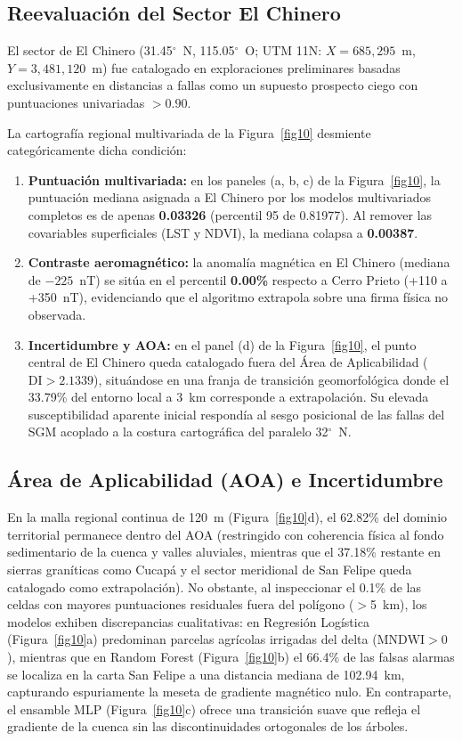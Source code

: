 \documentclass[10pt,twocolumn,a4paper]{article}
\begin{document}
\subsection{Reevaluación del Sector El Chinero}
El sector de El Chinero (31.45$^\circ$~N, 115.05$^\circ$~O; UTM 11N: $X = 685,295$~m, $Y = 3,481,120$~m) fue catalogado en exploraciones preliminares basadas exclusivamente en distancias a fallas como un supuesto prospecto ciego con puntuaciones univariadas $>0.90$.

La cartografía regional multivariada de la Figura~\ref{fig10} desmiente categóricamente dicha condición:
\begin{enumerate}
\itemsep0pt  
\item \textbf{Puntuación multivariada:} en los paneles (a, b, c) de la Figura~\ref{fig10}, la puntuación mediana asignada a El Chinero por los modelos multivariados completos es de apenas \textbf{0.03326} (percentil 95 de 0.81977). Al remover las covariables superficiales (LST y NDVI), la mediana colapsa a \textbf{0.00387}.
\item \textbf{Contraste aeromagnético:} la anomalía magnética en El Chinero (mediana de $-225$~nT) se sitúa en el percentil \textbf{0.00\%} respecto a Cerro Prieto (+110 a +350~nT), evidenciando que el algoritmo extrapola sobre una firma física no observada.
\item \textbf{Incertidumbre y AOA:} en el panel (d) de la Figura~\ref{fig10}, el punto central de El Chinero queda catalogado fuera del Área de Aplicabilidad ($\text{DI} > 2.1339$), situándose en una franja de transición geomorfológica donde el 33.79\% del entorno local a 3~km corresponde a extrapolación. Su elevada susceptibilidad aparente inicial respondía al sesgo posicional de las fallas del SGM acoplado a la costura cartográfica del paralelo 32$^\circ$~N.
\end{enumerate}

\subsection{Área de Aplicabilidad (AOA) e Incertidumbre}
En la malla regional continua de 120~m (Figura~\ref{fig10}d), el 62.82\% del dominio territorial permanece dentro del AOA (restringido con coherencia física al fondo sedimentario de la cuenca y valles aluviales, mientras que el 37.18\% restante en sierras graníticas como Cucapá y el sector meridional de San Felipe queda catalogado como extrapolación). No obstante, al inspeccionar el 0.1\% de las celdas con mayores puntuaciones residuales fuera del polígono ($>$5~km), los modelos exhiben discrepancias cualitativas: en Regresión Logística (Figura~\ref{fig10}a) predominan parcelas agrícolas irrigadas del delta ($\text{MNDWI} > 0$), mientras que en Random Forest (Figura~\ref{fig10}b) el 66.4\% de las falsas alarmas se localiza en la carta San Felipe a una distancia mediana de 102.94~km, capturando espuriamente la meseta de gradiente magnético nulo. En contraparte, el ensamble MLP (Figura~\ref{fig10}c) ofrece una transición suave que refleja el gradiente de la cuenca sin las discontinuidades ortogonales de los árboles.
\end{document}
